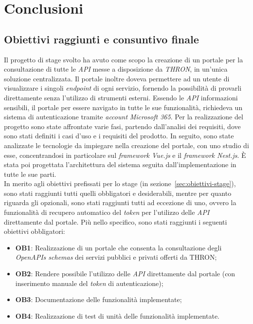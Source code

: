 \chapter{Conclusioni}\label{cap:conclusioni}


\section{Obiettivi raggiunti e consuntivo finale}\label{sec:obiettivi-raggiunti}
Il progetto di stage svolto ha avuto come scopo la creazione di un portale per la consultazione di tutte le \textit{API} messe a disposizione da \textit{THRON}, in un'unica soluzione centralizzata. 
Il portale inoltre doveva permettere ad un utente di visualizzare i singoli \textit{endpoint} di ogni servizio, fornendo la possibilità di provarli direttamente senza l'utilizzo di strumenti esterni.
Essendo le \textit{API} informazioni sensibili, il portale per essere navigato in tutte le sue funzionalità, richiedeva un sistema di autenticazione tramite \textit{account} \textit{Microsoft 365}.
Per la realizzazione del progetto sono state affrontate varie fasi, partendo dall'analisi dei requisiti, dove sono stati definiti i casi d'uso e i requisiti del prodotto.
In seguito, sono state analizzate le tecnologie da impiegare nella creazione del portale, con uno studio di esse, concentrandosi in particolare sul \textit{framework Vue.js} e il \textit{framework Nest.js}.
È stata poi progettata l'architettura del sistema seguita dall'implementazione in tutte le sue parti.\\

In merito agli obiettivi prefissati per lo stage (in sezione~\ref{sec:obiettivi-stage}), sono stati raggiunti tutti quelli obbligatori e desiderabili, mentre per quanto riguarda gli opzionali, sono stati raggiunti tutti ad eccezione di uno, ovvero la funzionalità di recupero automatico del \textit{token} per l'utilizzo delle \textit{API} direttamente dal portale.
Più nello specifico, sono stati raggiunti i seguenti obiettivi obbligatori:
\begin{itemize}
  \item \textbf{OB1}: Realizzazione di un portale che consenta la consultazione degli \textit{OpenAPIs schemas} dei servizi pubblici e privati offerti da THRON;
  \item \textbf{OB2}: Rendere possibile l'utilizzo delle \textit{API} direttamente dal portale (con inserimento manuale del \textit{token} di autenticazione);
  \item \textbf{OB3}: Documentazione delle funzionalità implementate;
  \item \textbf{OB4}: Realizzazione di test di unità delle funzionalità implementate.
\end{itemize}

